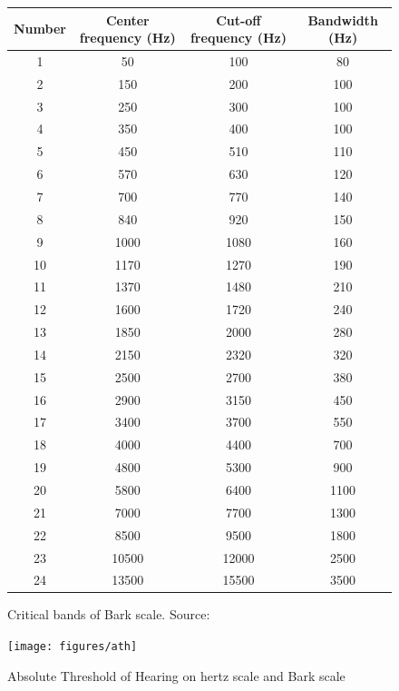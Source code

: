 \documentclass[english,bachelor,a4paper,oneside]{ppfcmthesis}
\begin{document}
\begin{figure}[h]
  \centering
  \begin{tabular} { | c | c | c | c | }
  \hline
  Number & Center frequency (Hz) & Cut-off frequency (Hz) & Bandwidth (Hz) \\
  \hline
  1 & 50 & 100 & 80 \\
  \hline
  2 & 150 & 200 & 100 \\
  \hline
  3 & 250 & 300 & 100 \\
  \hline
  4 & 350 & 400 & 100 \\
  \hline
  5 & 450 & 510 & 110 \\
  \hline
  6 & 570 & 630 & 120 \\
  \hline
  7 & 700 & 770 & 140 \\
  \hline
  8 & 840 & 920 & 150 \\
  \hline
  9 & 1000 & 1080 & 160 \\
  \hline
  10 & 1170 & 1270 & 190 \\
  \hline
  11 & 1370 & 1480 & 210 \\
  \hline
  12 & 1600 & 1720 & 240 \\
  \hline
  13 & 1850 & 2000 & 280 \\
  \hline
  14 & 2150 & 2320 & 320 \\
  \hline
  15 & 2500 & 2700 & 380 \\
  \hline
  16 & 2900 & 3150 & 450 \\
  \hline
  17 & 3400 & 3700 & 550 \\
  \hline
  18 & 4000 & 4400 & 700 \\
  \hline
  19 & 4800 & 5300 & 900 \\
  \hline
  20 & 5800 & 6400 & 1100 \\
  \hline
  21 & 7000 & 7700 & 1300 \\
  \hline
  22 & 8500 & 9500 & 1800 \\
  \hline
  23 & 10500 & 12000 & 2500 \\
  \hline
  24 & 13500 & 15500 & 3500 \\
  \hline
  \end{tabular}
  \caption[Critical bands of Bark scale]{Critical bands of Bark scale. Source:~\cite{Bark}}
  \label{fig:bark-table}
\end{figure}

\begin{figure}[p]
  \centering
  \texttt{[image: figures/ath]}
  \caption{Absolute Threshold of Hearing on hertz scale and Bark scale}
  \label{fig:ath-bark}
\end{figure}
\end{document}
